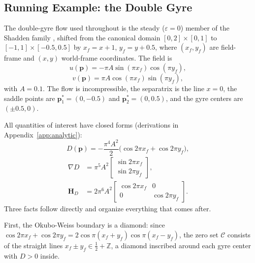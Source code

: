 \documentclass[lettersize,journal]{IEEEtran}
\begin{document}
\subsection{Running Example: the Double Gyre}
\label{sec:dg_example}

The double-gyre flow used throughout is the steady ($\varepsilon = 0$)
member of the Shadden family \cite{8}, shifted from the canonical domain
$[0,2] \times [0,1]$ to $[-1,1] \times [-0.5, 0.5]$ by
$x_f = x + 1$, $y_f = y + 0.5$, where $(x_f, y_f)$ are field-frame and
$(x, y)$ world-frame coordinates. The field is
\begin{equation}
    u(\mathbf{p}) = -\pi A \sin(\pi x_f) \cos(\pi y_f), \label{eq:dg_u}
\end{equation}
\begin{equation}
    v(\mathbf{p}) = \pi A \cos(\pi x_f) \sin(\pi y_f), \label{eq:dg_v}
\end{equation}
with $A = 0.1$. The flow is incompressible, the separatrix is the line
$x = 0$, the saddle points are $\mathbf{p}^*_1 = (0, -0.5)$ and
$\mathbf{p}^*_2 = (0, 0.5)$, and the gyre centers are $(\pm 0.5, 0)$.

All quantities of interest have closed forms (derivations in
Appendix~\ref{app:analytic}):
\begin{equation}
    D(\mathbf{p}) = -\frac{\pi^4 A^2}{2}
    \bigl(\cos 2\pi x_f + \cos 2\pi y_f\bigr),
    \label{eq:det_analytic_main}
\end{equation}
\begin{equation}
    \begin{aligned}
    \nabla D &= \pi^5 A^2
    \begin{bmatrix} \sin 2\pi x_f \\ \sin 2\pi y_f \end{bmatrix},
    \\
    \mathbf{H}_D &= 2\pi^6 A^2
    \begin{bmatrix} \cos 2\pi x_f & 0 \\ 0 & \cos 2\pi y_f \end{bmatrix}.
    \end{aligned}
    \label{eq:gradhess_analytic_main}
\end{equation}
Three facts follow directly and organize everything that comes after.

First, the Okubo-Weiss boundary is a diamond: since $\cos 2\pi x_f +
\cos 2\pi y_f = 2\cos\pi(x_f + y_f)\cos\pi(x_f - y_f)$, the zero set
$\mathcal{C}$ consists of the straight lines $x_f \pm y_f \in
\tfrac{1}{2} + \mathbb{Z}$, a diamond inscribed around each gyre center
with $D > 0$ inside.
\end{document}
